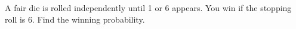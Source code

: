 A fair die is rolled independently until 1 or 6 appears. You win if the stopping roll is 6. Find the winning probability.
